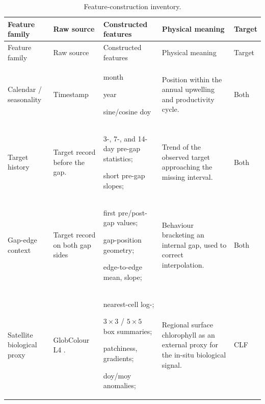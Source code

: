 \begin{small}
\setlength{\tabcolsep}{4pt}
\renewcommand{\arraystretch}{1.18}

\begin{longtable}{P{2.4cm}P{3.2cm}P{4.9cm}P{4.4cm}P{1cm}}  \caption{Feature-construction inventory.}
  \label{tab:appendix_feature_construction} \\
  \toprule
  Feature family & Raw source & Constructed features & Physical meaning & Target \\
  \midrule
  \endfirsthead

  \toprule
  Feature family & Raw source & Constructed features & Physical meaning & Target \\
  \midrule
  \endhead

  \bottomrule
  \endfoot

  Calendar / seasonality
  & Timestamp
  & \begin{tabitemize}[leftmargin=*, nosep, topsep=0pt]
    \item month
    \item year
    \item sine/cosine doy
  \end{tabitemize}
  & Position within the annual upwelling and productivity cycle.
  & Both \\

  Target history
& Target record before the gap.
& \begin{tabitemize}[leftmargin=*, nosep, topsep=0pt]
    \item 3-, 7-, and 14-day pre-gap statistics;
    \item short pre-gap slopes;
  \end{tabitemize}
& Trend of the observed target approaching the missing interval.
& Both \\

  Gap-edge context
  & Target record on both gap sides
  & \begin{tabitemize}[leftmargin=*, nosep, topsep=0pt]
    \item first pre/post-gap values;
    \item gap-position geometry;
    \item edge-to-edge mean, slope;
  \end{tabitemize}
  & Behaviour bracketing an internal gap, used to correct interpolation.
  & Both \\

  Satellite biological proxy
  & GlobColour L4 \chl{} \citep{garnesson2019globcolour}.
  & \begin{tabitemize}[leftmargin=*, nosep, topsep=0pt]
    \item nearest-cell log-\chl{};
    \item $3\times3$ / $5\times5$ box summaries;
    \item patchiness, gradients;
    \item doy/moy anomalies;
  \end{tabitemize}
  & Regional surface chlorophyll as an external proxy for the in-situ biological signal.
  & CLF \\


\end{longtable}
\end{small}

